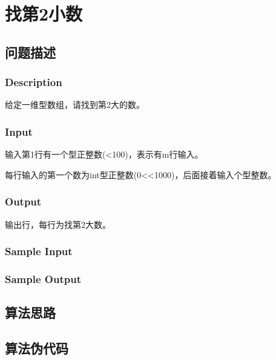 \section{找第2小数}
\subsection{问题描述}
\subsubsection*{Description}
给定一维型数组，请找到第2大的数。

\subsubsection*{Input}

输入第1行有一个型正整数(<100)，表示有m行输入。

每行输入的第一个数为int型正整数(0<<1000)，后面接着输入个型整数。

\subsubsection*{Output}

输出行，每行为找第2大数。

\subsubsection*{Sample Input}




\subsubsection*{Sample Output}



\subsection{算法思路}

\subsection{算法伪代码}

